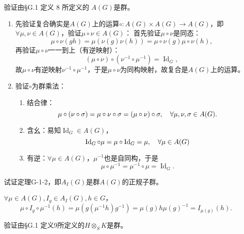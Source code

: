 \begin{xiti}
    \item 验证由\S G.1 定义 8 所定义的 $A(G) $是群。

    \begin{zm}
    	\begin{enumerate}
    		\item 先验证复合确实是$A(G) $上的运算$\circ\colon A(G)\times A(G) \rightarrow A(G) $，即$\forall \mu,\nu \in A(G) $，验证$\mu \circ \nu \in A(G) $：
    		首先验证$\mu\circ \nu $是同态：\[ \mu\circ \nu (gh)=\mu\left( \nu(g) \nu(h) \right) =\mu\circ \nu (g) \mu\circ \nu(h), \]
    		再验证$\mu\circ \nu $一一到上（有逆映射）：\[ \left(\mu\circ \nu\right) \circ \left(\nu^{-1} \circ \mu^{-1}\right) = \operatorname{Id}_G, \]
    		故$\mu\circ\nu $有逆映射$\nu^{-1} \circ \mu^{-1} $，于是$\mu\circ\nu$为同构映射，故复合是$A(G)$上的运算。
    		\item 验证$\circ$为群乘法：
    		\begin{enumerate}
    			\item 结合律：\[ \mu \circ \left( \nu \circ \sigma \right) =\mu \circ \nu \circ \sigma = \left( \mu \circ \nu \right) \circ \sigma\qc \forall \mu,\nu,\sigma \in A(G). \]
    			\item 含幺：易知$\operatorname{Id}_G \in A(G) $，\[ \operatorname{Id}_G \circ \mu = \mu \circ \operatorname{Id}_{G} = \mu\qc \forall \mu \in A(G) \]
    			\item 有逆：$\forall \mu \in A(G) $，$\mu^{-1}$也是自同构，于是\[ \mu \circ \mu^{-1} = \mu^{-1} \circ \mu = \operatorname{Id}_G. \]
    		\end{enumerate}
    	\end{enumerate}
    \end{zm}

    \item 试证定理G-1-2，即$A_I(G)$是群$A(G)$的正规子群。

    \begin{zm}
    	$\forall \mu \in A(G),I_g\in A_I(G),h\in G $，\[ \mu\circ I_g \circ \mu^{-1} (h) =\mu \left( g (\mu^{-1} h) g^{-1} \right) = \mu(g) h \mu(g)^{-1} = I_{\mu(g)}(h) . \]
    \end{zm}

    \item 验证由\S G.1 定义9所定义的$H \otimes_S K $是群。


\end{xiti}
